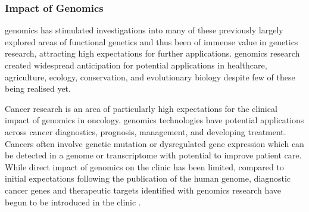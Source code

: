 \subsubsection{Impact of Genomics}
\Gls{genomics} has stimulated investigations into many of these previously largely explored areas of functional genetics and thus been of immense value in genetics research, attracting high expectations for further applications. \Gls{genomics} research created widespread anticipation for potential applications in healthcare, agriculture, ecology, conservation, and evolutionary biology despite few of these being realised yet.

Cancer research is an area of particularly high expectations for the clinical impact of \gls{genomics} in oncology. \Gls{genomics} technologies have potential applications across cancer diagnostics, prognosis, management, and developing treatment. Cancers often involve genetic mutation or dysregulated gene expression which can be detected in a genome or transcriptome with potential to improve patient care. While direct impact of \gls{genomics} on the clinic has been limited, compared to initial expectations following the publication of the human genome, diagnostic cancer genes and therapeutic targets identified with \gls{genomics} research have begun to be introduced in the clinic \citep{Stratton2009}.


